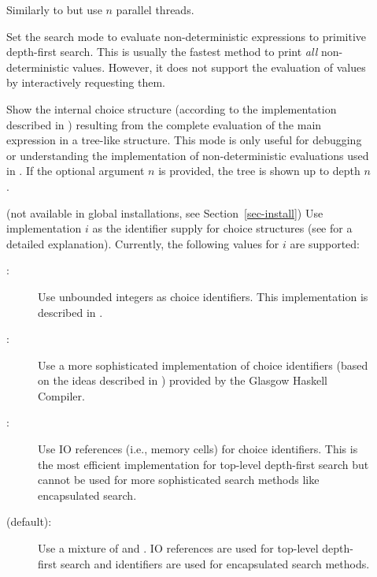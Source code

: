 \begin{description}
\item[]
Similarly to  but use $n$ parallel threads.

\item[]
Set the search mode to evaluate non-deterministic expressions
to primitive depth-first search. This is usually the fastest method
to print \emph{all} non-deterministic values.
However, it does not support the evaluation of values
by interactively requesting them.

\item[]
Show the internal choice structure
(according to the implementation described in
\cite{BrasselHanusPeemoellerReck11})
resulting from the complete evaluation of the main expression
in a tree-like structure.
This mode is only useful for debugging or
understanding the implementation of non-deterministic
evaluations used in \CYS.
If the optional argument $n$ is provided,
the tree is shown up to depth $n$.

\item[]
(not available in global installations, see Section~\ref{sec-install})
Use implementation $i$ as the identifier supply for choice structures
(see \cite{BrasselHanusPeemoellerReck11} for a detailed explanation).
Currently, the following values for $i$ are supported:
\begin{description}
\item[:]
Use unbounded integers as choice identifiers.
This implementation is described in \cite{BrasselHanusPeemoellerReck11}.
\item[:]
Use a more sophisticated implementation of choice
identifiers (based on the ideas described in \cite{AugustssonRittriSynek94})
provided by the Glasgow Haskell Compiler.
\item[:]
Use IO references (i.e., memory cells) for choice identifiers.
This is the most efficient implementation for top-level depth-first search
but cannot be used for more sophisticated search methods
like encapsulated search.
\item[ (default):]
Use a mixture of  and .
IO references are used for top-level depth-first search
and  identifiers are used for encapsulated search methods.
\end{description}


\end{description}
